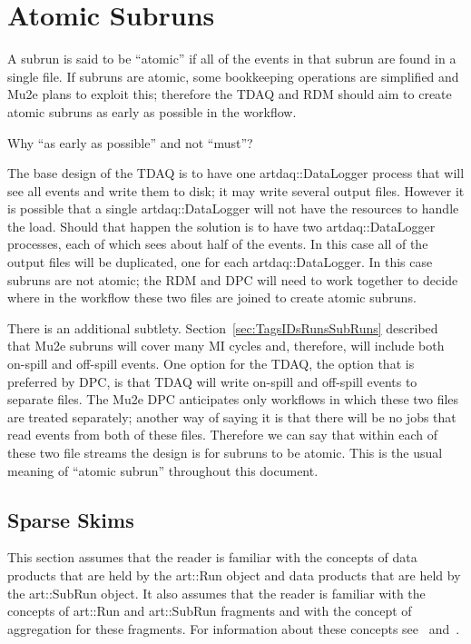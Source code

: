 \section{Atomic Subruns}
\label{sec:AtomicSubruns}

A subrun is said to be ``atomic'' if all of the events in that subrun are found in a single \art file.
If subruns are atomic, some bookkeeping operations are simplified and Mu2e plans to exploit this;
therefore the TDAQ and RDM should aim to create atomic subruns as early as possible in the workflow.

Why ``as early as possible'' and not ``must''? 

The base design of the TDAQ is to have one {\code artdaq::DataLogger} process that will
see all events and write them to disk; it may write several output files.
However it is possible that a single {\code artdaq::DataLogger} will not have the
resources to handle the load.  Should that happen the solution is to have two
{\code artdaq::DataLogger} processes, each of which sees about half of the events.
In this case all of the output files will be duplicated,
one for each {\code artdaq::DataLogger}.
In this case subruns are not atomic;
the RDM and DPC will need to work together to decide where in the workflow these two files
are joined to create atomic subruns.

There is an additional subtlety.
Section~\ref{sec:TagsIDsRunsSubRuns} described that Mu2e subruns will cover many MI cycles
and, therefore, will include both on-spill and off-spill events.
One option for the TDAQ, the option that is preferred by DPC,
is that TDAQ will write on-spill and off-spill events to separate files.
The Mu2e DPC anticipates only workflows in which these two files are treated separately;
another way of saying it is that there will be no jobs that read events from both of these files.
Therefore we can say that within each of these two file streams the design is for subruns to be atomic.
This is the usual meaning of ``atomic subrun'' throughout this document.

\subsection{Sparse Skims}

This section assumes that the reader is familiar with the \art concepts
of data products that are held by the {\code art::Run} object
and data products that are held by the {\code art::SubRun} object.
It also assumes that the reader is familiar with the \art concepts
of {\code art::Run} and {\code art::SubRun} fragments
and with the concept of aggregation for these fragments.
For information about these concepts see~\cite{RunAndSubRunProducts}
and~\cite{ProductAggregation}.


